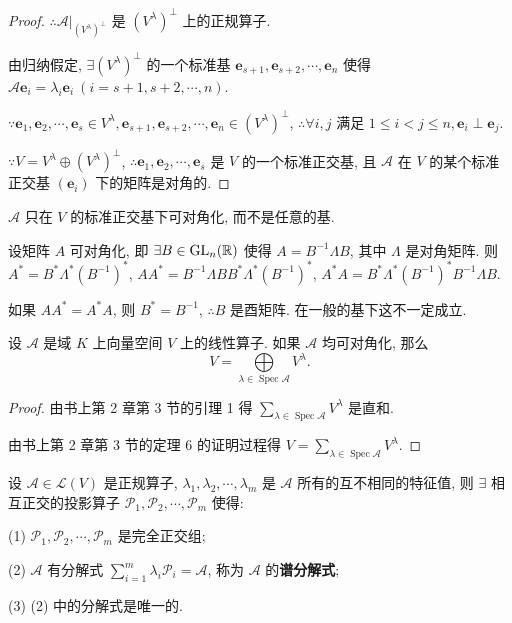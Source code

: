 \documentclass[color=black,device=normal,lang=cn,mode=geye]{elegantnote}
\begin{document}
\begin{proof}
    $\therefore\mathcal{A}|_{(V^\lambda)^\perp}$ 是 $(V^\lambda)^\perp$ 上的正规算子.
    
    由归纳假定, $\exists(V^\lambda)^\perp$ 的一个标准基 $\boldsymbol{e}_{s+1},\boldsymbol{e}_{s+2},\cdots,\boldsymbol{e}_n$ 使得 $\mathcal{A}\boldsymbol{e}_i=\lambda_i\boldsymbol{e}_i\ (i=s+1,s+2,\cdots,n)$.

    $\because\boldsymbol{e}_1,\boldsymbol{e}_2,\cdots,\boldsymbol{e}_s\in V^\lambda,\boldsymbol{e}_{s+1},\boldsymbol{e}_{s+2},\cdots,\boldsymbol{e}_n\in(V^\lambda)^\perp$, $\therefore\forall i,j$ 满足 $1\leq i<j\leq n,\boldsymbol{e}_i\perp\boldsymbol{e}_j$.

    $\because V=V^\lambda\oplus(V^\lambda)^\perp$, $\therefore\boldsymbol{e}_1,\boldsymbol{e}_2,\cdots,\boldsymbol{e}_s$ 是 $V$ 的一个标准正交基, 且 $\mathcal{A}$ 在 $V$ 的某个标准正交基 $(\boldsymbol{e}_i)$ 下的矩阵是对角的.
\end{proof}
\begin{note}
    $\mathcal{A}$ 只在 $V$ 的标准正交基下可对角化, 而不是任意的基.

    设矩阵 $A$ 可对角化, 即 $\exists B\in\operatorname{GL} _n(\mathbb{R})$ 使得 $A=B^{-1}\Lambda B$, 其中 $\Lambda$ 是对角矩阵. 则 $A^*=B^*\Lambda^*(B^{-1})^*$, $AA^*=B^{-1}\Lambda BB^*\Lambda^*(B^{-1})^*$, $A^*A=B^*\Lambda^*(B^{-1})^*B^{-1}\Lambda B$.

    如果 $AA^*=A^*A$, 则 $B^*=B^{-1}$, $\therefore B$ 是酉矩阵. 在一般的基下这不一定成立.
\end{note}
\begin{lemma}\label{l3.4}
    设 $\mathcal{A}$ 是域 $K$ 上向量空间 $V$ 上的线性算子. 如果 $\mathcal{A}$ 均可对角化, 那么
    \[V=\bigoplus\limits_{\lambda\in\operatorname{Spec}\mathcal{A}}V^\lambda.\]
\end{lemma}
\begin{proof}
    由书上第 2 章第 3 节的引理 1 得 $\sum\limits_{\lambda\in\operatorname{Spec}\mathcal{A}}V^\lambda$ 是直和.

    由书上第 2 章第 3 节的定理 6 的证明过程得 $V=\sum\limits_{\lambda\in\operatorname{Spec}\mathcal{A}}V^\lambda$.
\end{proof}
\begin{theorem}\label{t3.8}
    设 $\mathcal{A}\in\mathcal{L}(V)$ 是正规算子, $\lambda_1,\lambda_2,\cdots,\lambda_m$ 是 $\mathcal{A}$ 所有的互不相同的特征值, 则 $\exists$ 相互正交的投影算子 $\mathcal{P}_1,\mathcal{P}_2,\cdots,\mathcal{P}_m$ 使得:

    (1) $\mathcal{P}_1,\mathcal{P}_2,\cdots,\mathcal{P}_m$ 是完全正交组;

    (2) $\mathcal{A}$ 有分解式 $\sum\limits_{i=1}^m\lambda_i\mathcal{P}_i=\mathcal{A}$, 称为 $\mathcal{A}$ 的\textbf{谱分解式};

    (3) (2) 中的分解式是唯一的.
\end{theorem}
\end{document}
